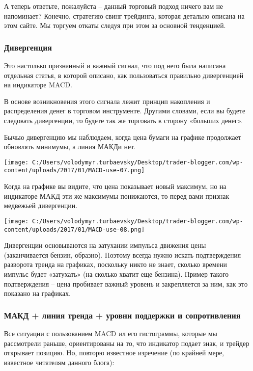 \documentclass[a5paper]{article}
\begin{document}
А теперь ответьте, пожалуйста – данный торговый подход ничего вам не
напоминает? Конечно, стратегию свинг трейдинга, которая детально
описана на этом сайте. Мы торгуем откаты следуя при этом за основной
тенденцией.

\subsubsection{Дивергенция}

Это настолько признанный и важный сигнал, что под него была написана отдельная статья, в которой описано, как пользоваться правильно дивергенцией на индикаторе MACD.

В основе возникновения этого сигнала лежит принцип накопления и распределения денег в торговом инструменте. Другими словами, если вы будете следовать дивергенции, то будете так же торговать в сторону «больших денег».

Бычью дивергенцию мы наблюдаем, когда цена бумаги на графике продолжает обновлять минимумы, а линия МАКДи нет.

\texttt{[image: C:/Users/volodymyr.turbaevsky/Desktop/trader-blogger.com/wp-content/uploads/2017/01/MACD-use-07.png]}

Когда на графике вы видите, что цена показывает новый максимум, но на
индикаторе МАКД эти же максимумы понижаются, то перед вами признак
медвежьей дивергенции.

\texttt{[image: C:/Users/volodymyr.turbaevsky/Desktop/trader-blogger.com/wp-content/uploads/2017/01/MACD-use-08.png]}

Дивергенции основываются на затухании импульса движения цены
(заканчивается бензин, образно). Поэтому всегда нужно искать
подтверждения разворота тренда на графиках, поскольку никто не знает,
сколько времени импульс будет «затухать» (на сколько хватит еще
бензина). Пример такого подтверждения – цена пробивает важный уровень
и закрепляется за ним, как это показано на графиках.

\subsubsection{МАКД + линия тренда + уровни поддержки и сопротивления}

Все ситуации с пользованием MACD ил его гистограммы, которые мы рассмотрели раньше, ориентированы на то, что индикатор подает знак, и трейдер открывает позицию. Но, повторю известное изречение (по крайней мере, известное читателям данного блога):
\end{document}
